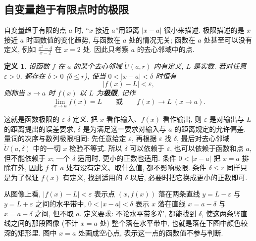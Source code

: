 \documentclass[UTF8,openany]{ctexbook}
\theoremstyle{chinesetextbook}
\newtheorem{definition}{定义}[section]
\begin{document}
\subsection{自变量趋于有限点时的极限}
自变量趋于有限的点 $a$ 时, “$x$ 接近 $a$”用距离 $|x-a|$ 很小来描述. 极限描述的是 $x$ 接近 $a$ 时函数值的变化趋势, 与函数在 $a$ 处的情况无关; 函数在 $a$ 处甚至可以没有定义, 例如 $\displaystyle\frac{x^2-4}{x-2}$ 在 $x=2$ 处. 因此只考察 $a$ 的去心邻域中的点.
\begin{definition}
设函数 $f$ 在 $a$ 的某个去心邻域 $\mathring U(a,r)$ 内有定义, $L$ 是实数. 若对任意 $\varepsilon>0$, 都存在 $\delta>0$ ($\delta\le r$), 使当 $0<|x-a|<\delta$ 时恒有
\[
|f(x)-L|<\varepsilon,
\]
则称当 $x\to a$ 时 $f(x)$ 以 $L$ 为\textbf{极限}, 记作
\[
\lim_{x\to a}f(x)=L\qquad\text{或}\qquad f(x)\to L\ (x\to a).
\]
\end{definition}
这就是函数极限的 $\varepsilon$-$\delta$ 定义. 把 $x$ 看作输入、$f(x)$ 看作输出, 则 $\varepsilon$ 是对输出与 $L$ 的距离提出的误差要求, $\delta$ 是为满足这一要求对输入与 $a$ 的距离规定的允许偏差. 量词的次序与数列极限相同: 先任意给定 $\varepsilon$, 再根据 $\varepsilon$ 找 $\delta$, 最后对去心邻域 $\mathring U(a,\delta)$ 中的一切 $x$ 检验不等式. 所以 $\delta$ 可以依赖于 $\varepsilon$, 也可以依赖于函数和点 $a$, 但不能依赖于 $x$; 一个 $\delta$ 适用时, 更小的正数也适用. 条件 $0<|x-a|$ 把 $x=a$ 排除在外, 因此 $f$ 在 $a$ 处有没有定义、取什么值, 都不影响极限. 条件 $\delta\le r$ 同样只是为了保证 $f(x)$ 有定义, 找到适用的 $\delta$ 以后, 必要时把它换成更小的正数即可.

从图像上看, $|f(x)-L|<\varepsilon$ 表示点 $(x,f(x))$ 落在两条直线 $y=L-\varepsilon$ 与 $y=L+\varepsilon$ 之间的水平带中, $0<|x-a|<\delta$ 表示 $x$ 落在直线 $x=a-\delta$ 与 $x=a+\delta$ 之间, 但不取 $a$. 定义要求: 不论水平带多窄, 都能找到 $\delta$, 使这两条竖直线之间的那段图像 (不计 $x=a$ 处) 整个落在水平带中, 也就是落在下图中颜色较深的矩形里. 图中 $x=a$ 处画成空心点, 表示这一点的函数值不参与判断.
\begin{center}
\end{center}
\end{document}

